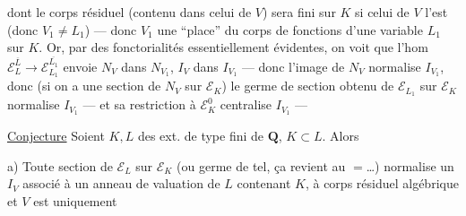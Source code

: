 dont le corps résiduel (contenu dans celui de $V$) sera  fini sur $K$ si celui de $V$ l'est (donc $V_1\ne L_1$) --- donc $V_1$ \deleted{$\longrightarrow$}  une ``place'' du corps de fonctions d'une variable $L_1$ sur $K$. Or, par des fonctorialités essentiellement évidentes, on voit que l'hom $\mathcal E_L^{\overline L}\longrightarrow\mathcal E_{L_1}^{\overline{L_1}}$ envoie $N_V$ dans $N_{V_1}$, $I_V$ dans $I_{V_1}$ --- donc l'image de $N_V$ normalise $I_{V_1}$, donc (si on a une  section de $N_V$ sur $\mathcal E_K$) le germe de section obtenu de $\mathcal E_{L_1}$ sur $\mathcal E_K$ normalise $I_{V_1}$ --- et sa restriction à $\mathcal E_K^0$ centralise $I_{V_1}$ ---

\uline{Conjecture} Soient $K,L$ des ext. de type fini de $\mathbf Q$, $K\subset L$. Alors

a) Toute section de $\mathcal E_L$ sur $\mathcal E_K$ (ou germe de tel, ça revient au $=$\ldots) normalise un $I_V$ associé à un anneau de valuation  de $L$ contenant $K$, à corps résiduel algébrique  \deleted{\unsure{,}} et  $V$ est uniquement
